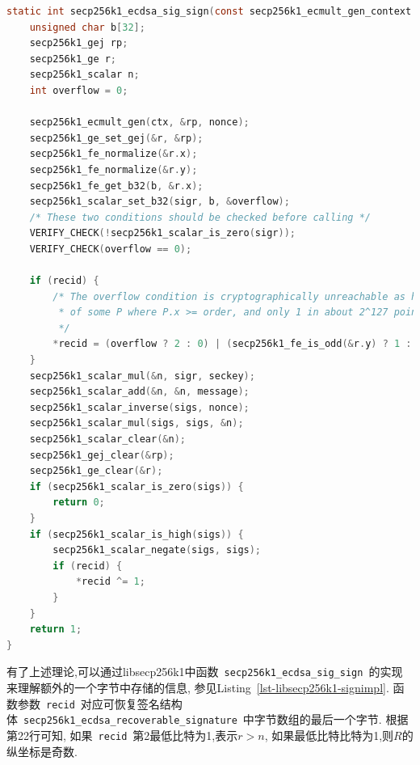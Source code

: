 \documentclass{article}
\newcommand{\code}[1]{\lstinline!#1!}
\begin{document}
\begin{lstlisting}[language=c, caption = libsecp256k1中的\textsf{secp256k1_ecdsa_sig_sign}, label=lst-libsecp256k1-signimpl]
static int secp256k1_ecdsa_sig_sign(const secp256k1_ecmult_gen_context *ctx, secp256k1_scalar *sigr, secp256k1_scalar *sigs, const secp256k1_scalar *seckey, const secp256k1_scalar *message, const secp256k1_scalar *nonce, int *recid) {
    unsigned char b[32];
    secp256k1_gej rp;
    secp256k1_ge r;
    secp256k1_scalar n;
    int overflow = 0;

    secp256k1_ecmult_gen(ctx, &rp, nonce);
    secp256k1_ge_set_gej(&r, &rp);
    secp256k1_fe_normalize(&r.x);
    secp256k1_fe_normalize(&r.y);
    secp256k1_fe_get_b32(b, &r.x);
    secp256k1_scalar_set_b32(sigr, b, &overflow);
    /* These two conditions should be checked before calling */
    VERIFY_CHECK(!secp256k1_scalar_is_zero(sigr));
    VERIFY_CHECK(overflow == 0);

    if (recid) {
        /* The overflow condition is cryptographically unreachable as hitting it requires finding the discrete log
         * of some P where P.x >= order, and only 1 in about 2^127 points meet this criteria.
         */
        *recid = (overflow ? 2 : 0) | (secp256k1_fe_is_odd(&r.y) ? 1 : 0);
    }
    secp256k1_scalar_mul(&n, sigr, seckey);
    secp256k1_scalar_add(&n, &n, message);
    secp256k1_scalar_inverse(sigs, nonce);
    secp256k1_scalar_mul(sigs, sigs, &n);
    secp256k1_scalar_clear(&n);
    secp256k1_gej_clear(&rp);
    secp256k1_ge_clear(&r);
    if (secp256k1_scalar_is_zero(sigs)) {
        return 0;
    }
    if (secp256k1_scalar_is_high(sigs)) {
        secp256k1_scalar_negate(sigs, sigs);
        if (recid) {
            *recid ^= 1;
        }
    }
    return 1;
}
\end{lstlisting}


有了上述理论,可以通过libsecp256k1中函数~\code{secp256k1_ecdsa_sig_sign}~的实现来理解额外的一个字节中存储的信息,
参见Listing~\ref{lst-libsecp256k1-signimpl}.
函数参数~\code{recid}~对应可恢复签名结构体~\code{secp256k1_ecdsa_recoverable_signature}~中字节数组的最后一个字节.
根据第22行可知, 如果~\code{recid}~第2最低比特为1,表示$r > n$, 如果最低比特比特为1,则$R$的纵坐标是奇数.
\end{document}
